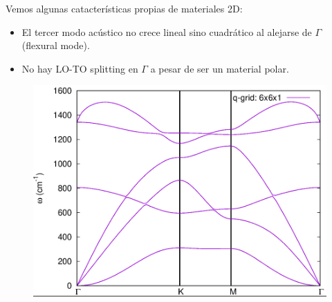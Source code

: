   Vemos algunas catacterísticas propias de materiales 2D:
    \begin{itemize}
      \item El tercer modo acústico no crece lineal sino cuadrático al alejarse de $\Gamma$ (flexural mode).
      \item No hay LO-TO splitting en $\Gamma$ a pesar de ser un material polar.
    \end{itemize}

    \begin{figure}[H]
        \centering
        \includegraphics[scale = 0.4]{figs/D5/BN_disp.png}
    \end{figure}
